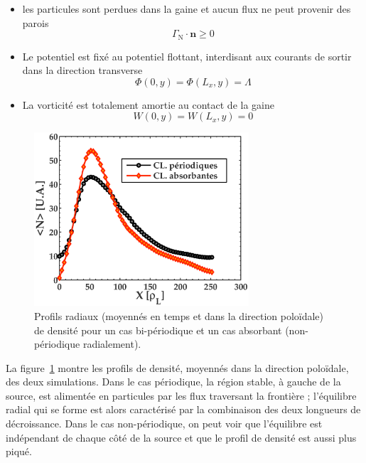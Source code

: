 \begin{refsection}
	\begin{itemize}
	  \item les particules sont perdues dans la gaine et aucun flux ne peut
	  provenir des parois 
	  \begin{equation}
	  	\Gamma_\text{N}\cdot\mathbf n\ge0
	  \end{equation}
	  \item Le
	potentiel est fixé au potentiel flottant, interdisant aux
	courants de sortir dans la direction transverse
	\begin{equation}
	  	\Phi(0,y)=\Phi(L_x,y)=\Lambda
	  \end{equation}
	\item La vorticité est totalement amortie au contact de la gaine 
	\begin{equation}
	  	W(0,y)=W(L_x,y)=0
	  \end{equation}
	\end{itemize}
	
	
\begin{figure}[!htbp]
\centering
    \includegraphics[width=8cm]{figures/2-profileDenNoLimit.eps}
    \caption{Profils radiaux (moyennés en temps et dans la direction poloïdale)
    de densité pour un cas bi-périodique et un cas absorbant
    (non-périodique radialement)\label{2-profileDenNoLimit}.}
\end{figure}
	La figure~\ref{2-profileDenNoLimit} montre les profils de densité, moyennés
	dans la direction poloïdale, des deux simulations.
	Dans le cas périodique, la région stable, à gauche de la source, est alimentée
	en particules par les flux traversant la frontière ; l'équilibre radial qui se forme est alors
	caractérisé par la combinaison des deux longueurs de décroissance.
	Dans le cas non-périodique, on peut voir que l'équilibre est indépendant de
	chaque côté de la source et que le profil de densité est aussi plus piqué. 
	

\end{refsection}

